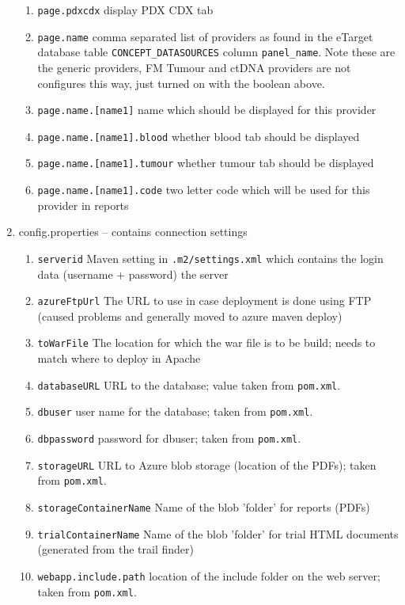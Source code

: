 \begin{enumerate}
\begin{enumerate}
  	  \item \verb|page.pdxcdx| display PDX CDX tab
  	  \item \verb|page.name| comma separated list of providers as found in the eTarget database table \verb|CONCEPT_DATASOURCES| column \verb|panel_name|. 
  	  Note these are the generic providers, FM Tumour and  ctDNA providers are not configures this way, just turned on with the boolean above.
  	  \item \verb|page.name.[name1]| name which should be displayed for this provider
  	  \item \verb|page.name.[name1].blood| whether blood tab should be displayed
  	  \item \verb|page.name.[name1].tumour| whether tumour tab should be displayed
  	  \item \verb|page.name.[name1].code| two letter code which will be used for this provider in reports 
	\end{enumerate}
  \item config.properties -- contains connection settings
    \begin{enumerate}
      \item \verb|serverid| Maven setting in \verb|.m2/settings.xml| which contains the login data (username + password) the server
      \item \verb|azureFtpUrl| The URL to use in case deployment is done using FTP (caused problems and generally moved to azure maven deploy)
      \item \verb|toWarFile| The location for which the war file is to be build; needs to match where to deploy in Apache
  	  \item \verb|databaseURL| URL to the database; value taken from \verb|pom.xml|. 
  	  \item \verb|dbuser| user name for the database; taken from \verb|pom.xml|.
  	  \item \verb|dbpassword| password for dbuser; taken from \verb|pom.xml|.
  	  \item \verb|storageURL| URL to Azure blob storage (location of the PDFs); taken from \verb|pom.xml|.
  	  \item \verb|storageContainerName| Name of the blob 'folder' for reports (PDFs)
  	  \item \verb|trialContainerName| Name of the blob 'folder' for trial HTML documents (generated from the trail finder)
  	  \item \verb|webapp.include.path| location of the include folder on the web server; taken from \verb|pom.xml|.

\end{enumerate}
\end{enumerate}
